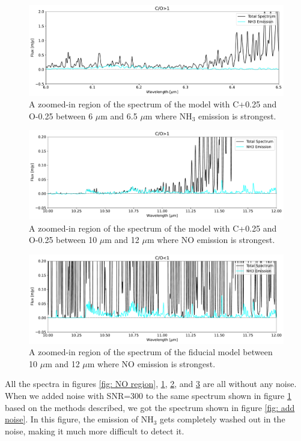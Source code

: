 \documentclass[oneside, single, authoryear, semicolon]{lion-msc}
\newcommand{\4}{$_4$}
\newcommand{\3}{$_3$}
\newcommand{\2}{$_2$}
\begin{document}
\begin{figure}[!ht]
    \centering
    \includegraphics[width=\linewidth]{Figures/NH3_region1.pdf}
    \caption{A zoomed-in region of the spectrum of the model with C+0.25 and O-0.25 between 6 $\mu$m and 6.5 $\mu$m where NH\3 emission is strongest.}
    \label{fig: NH3 region 1}
\end{figure}
\begin{figure}[!ht]
    \centering
    \includegraphics[width=\linewidth]{Figures/NH3_region2.pdf}
    \caption{A zoomed-in region of the spectrum of the model with C+0.25 and O-0.25 between 10 $\mu$m and 12 $\mu$m where NO emission is strongest.}
    \label{fig: NH3 region 2}
\end{figure}
\begin{figure}[!ht]
    \centering
    \includegraphics[width=\linewidth]{Figures/NH3_region3.pdf}
    \caption{A zoomed-in region of the spectrum of the fiducial model between 10 $\mu$m and 12 $\mu$m where NO emission is strongest.}
    \label{fig: NH3 region 3}
\end{figure}

All the spectra in figures \ref{fig: NO region}, \ref{fig: NH3 region 1}, \ref{fig: NH3 region 2}, and \ref{fig: NH3 region 3} are all without any noise. When we added noise with SNR=300 to the same spectrum shown in figure \ref{fig: NH3 region 1} based on the methods described, we got the spectrum shown in figure \ref{fig: add noise}. In this figure, the emission of NH\3 gets completely washed out in the noise, making it much more difficult to detect it.  
\end{document}
